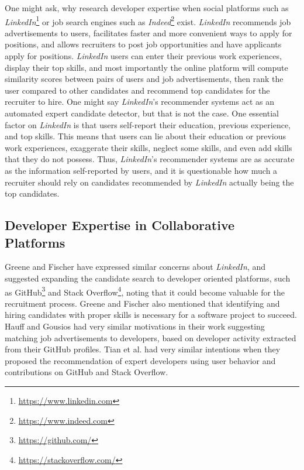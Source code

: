     One might ask, why research developer expertise when social platforms such as \emph{LinkedIn}\footnote{\url{https://www.linkedin.com}} or job search engines such as \emph{Indeed}\footnote{\url{https://www.indeed.com}} exist. \emph{LinkedIn} recommends job advertisements to users, facilitates faster and more convenient ways to apply for positions, and allows recruiters to post job opportunities and have applicants apply for positions. \emph{LinkedIn} users can enter their previous work experiences, display their top skills, and most importantly the online platform will compute similarity scores between pairs of users and job advertisements, then rank the user compared to other candidates and recommend top candidates for the recruiter to hire. One might say \emph{LinkedIn}'s recommender systems act as an automated expert candidate detector, but that is not the case. One essential factor on \emph{LinkedIn} is that users self-report their education, previous experience, and top skills. This means that users can lie about their education or previous work experiences, exaggerate their skills, neglect some skills, and even add skills that they do not possess. Thus, \emph{LinkedIn}'s recommender systems are as accurate as the information self-reported by users, and it is questionable how much a recruiter should rely on candidates recommended by \emph{LinkedIn} actually being the top candidates.
    
    \subsection{Developer Expertise in Collaborative Platforms}
        Greene and Fischer \cite{greene2016cvexplorer} have expressed similar concerns about \emph{LinkedIn}, and suggested expanding the candidate search to developer oriented platforms, such as GitHub\footnote{\url{https://github.com/}} and Stack Overflow\footnote{\url{https://stackoverflow.com/}}, noting that it could become valuable for the recruitment process. Greene and Fischer also mentioned that identifying and hiring candidates with proper skills is necessary for a software project to succeed. Hauff and Gousios \cite{hauff2015matching} had very similar motivations in their work suggesting matching job advertisements to developers, based on developer activity extracted from their GitHub profiles. Tian et al. \cite{tian2019geek} had very similar intentions when they proposed the recommendation of expert developers using user behavior and contributions on GitHub and Stack Overflow.
        
